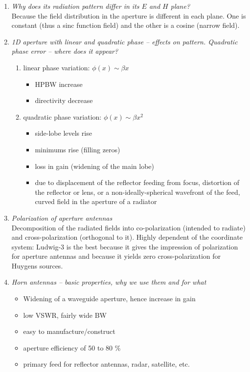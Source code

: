 \documentclass[11pt,a4paper]{article}
\begin{document}
\begin{enumerate}
    \item \emph{Why does its radiation pattern differ in its $E$ and $H$ plane?}\\
    Because the field distribution in the aperture is different in each plane. One is constant (thus a sinc function field) and the other is a cosine (narrow field).

    \item \emph{1D aperture with linear and quadratic phase -- effects on pattern. Quadratic phase error -- where does it appear?}
    \begin{enumerate}[label=(\alph*)]
        \item linear phase variation: $\phi(x) \sim \beta x$
        \begin{itemize}
            \item HPBW increase
            \item directivity decrease
        \end{itemize}
        \item quadratic phase variation: $\phi(x) \sim \beta x^2$
        \begin{itemize}
            \item side-lobe levels rise
            \item minimums rise (filling zeros)
            \item loss in gain (widening of the main lobe)
            \item due to displacement of the reflector feeding from focus, distortion of the reflector or lens, or a non-ideally-spherical wavefront of the feed, curved field in the aperture of a radiator
        \end{itemize}
    \end{enumerate}

    \item \emph{Polarization of aperture antennas}\\
    Decomposition of the radiated fields into co-polarization (intended to radiate) and cross-polarization (orthogonal to it). Highly dependent of the coordinate system: Ludwig-3 is the best because it gives the impression of polarization for aperture antennas and because it yields zero cross-polarization for Huygens sources.
    
    \item \emph{Horn antennas -- basic properties, why we use them and for what}
    \begin{itemize}
        \item Widening of a waveguide aperture, hence increase in gain
        \item low VSWR, fairly wide BW
        \item easy to manufacture/construct
        \item aperture efficiency of 50 to 80 \%
        \item primary feed for reflector antennas, radar, satellite, etc.
    \end{itemize}
    

\end{enumerate}
\end{document}
